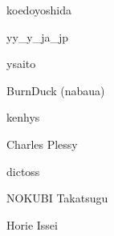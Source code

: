 \begin{prework}{ koedoyoshida }
\end{prework}

\begin{prework}{ yy\_y\_ja\_jp }
\end{prework}

\begin{prework}{ ysaito }
\end{prework}

\begin{prework}{ BurnDuck (nabaua) }
\end{prework}

\begin{prework}{ kenhys }
\end{prework}

\begin{prework}{ Charles Plessy }
\end{prework}

\begin{prework}{ dictoss }
\end{prework}

\begin{prework}{ NOKUBI Takatsugu }
\end{prework}

\begin{prework}{ Horie Issei }
\end{prework}

